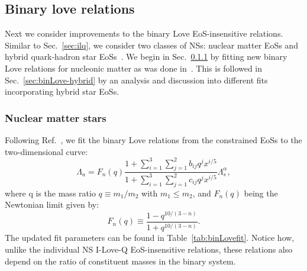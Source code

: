 \documentclass[prd,twocolumn,nofootinbib,superscriptaddress,amsmath,amssymb]{revtex4-1}
\begin{document}
\subsection{Binary love relations}\label{sec:binary}
Next we consider improvements to the binary Love EoS-insensitive relations.
Similar to Sec.~\ref{sec:ilq}, we consider two classes of NSs: nuclear matter EoSs and hybrid quark-hadron star EoSs~\cite{Paschalidis2018,Alford:2017qgh,1971SvA....15..347S,Zdunik:2012dj,Alford:2013aca}.
We begin in Sec.~\ref{sec:binLove-nuclear} by fitting new binary Love relations for nucleonic matter as was done in~\cite{Yagi:binLove}.
This is followed in Sec.~\ref{sec:binLove-hybrid} by an analysis and discussion into different fits incorporating hybrid star EoSs.

\subsubsection{Nuclear matter stars}\label{sec:binLove-nuclear}
Following Ref.~\cite{Yagi:binLove}, we fit the binary Love relations from the constrained EoSs to the two-dimensional curve:
\begin{equation}\label{eq:binLovefit}
\Lambda_a=F_n(q) \frac{1+ \sum_{i=1}^3 \sum_{j=1}^2 b_{ij}q^j x^{i/5}}{1 + \sum_{i=1}^3 \sum_{j=1}^2 c_{ij}q^j x^{i/5}} \Lambda_s^{\alpha},
\end{equation}
where q is the mass ratio $q \equiv m_1/m_2$ with $m_1 \leq m_2$, and $F_n(q)$ being the Newtonian limit given by:
\begin{equation}
F_n(q) \equiv \frac{1-q^{10/(3-n)}}{1+q^{10/(3-n)}}.
\end{equation}
The updated fit parameters can be found in Table~\ref{tab:binLovefit}.
Notice how, unlike the individual NS I-Love-Q EoS-insensitive relations, these relations also depend on the ratio of constituent masses in the binary system.
\end{document}
